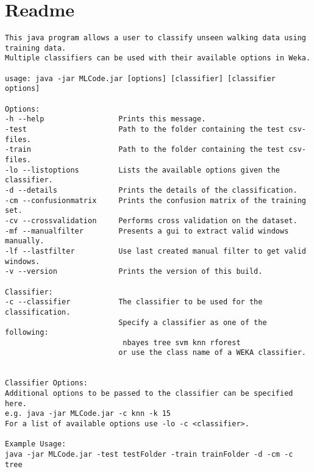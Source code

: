 \section{Readme}
\label{readme}
\begin{lstlisting}
This java program allows a user to classify unseen walking data using training data.
Multiple classifiers can be used with their available options in Weka.

usage: java -jar MLCode.jar [options] [classifier] [classifier options]

Options:
-h --help                 Prints this message.
-test                     Path to the folder containing the test csv-files.
-train                    Path to the folder containing the test csv-files.
-lo --listoptions         Lists the available options given the classifier.
-d --details              Prints the details of the classification.
-cm --confusionmatrix     Prints the confusion matrix of the training set.
-cv --crossvalidation     Performs cross validation on the dataset.
-mf --manualfilter        Presents a gui to extract valid windows manually.
-lf --lastfilter          Use last created manual filter to get valid windows.
-v --version              Prints the version of this build.

Classifier:
-c --classifier           The classifier to be used for the classification.
                          Specify a classifier as one of the following:
                           nbayes tree svm knn rforest
                          or use the class name of a WEKA classifier.


Classifier Options:
Additional options to be passed to the classifier can be specified here.
e.g. java -jar MLCode.jar -c knn -k 15 
For a list of available options use -lo -c <classifier>.

Example Usage:
java -jar MLCode.jar -test testFolder -train trainFolder -d -cm -c tree
\end{lstlisting}